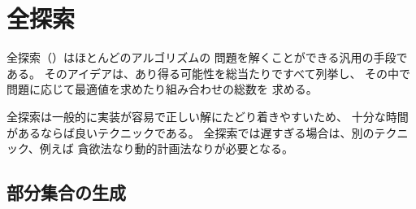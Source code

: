 \begin{comment}
\chapter{Complete search}

\key{Complete search}
is a general method that can be used
to solve almost any algorithm problem.
The idea is to generate all possible
solutions to the problem using brute force,
and then select the best solution or count the
number of solutions, depending on the problem.

Complete search is a good technique
if there is enough time to go through all the solutions,
because the search is usually easy to implement
and it always gives the correct answer.
If complete search is too slow,
other techniques, such as greedy algorithms or
dynamic programming, may be needed.
\end{comment}

\chapter{全探索}

全探索（）はほとんどのアルゴリズムの
問題を解くことができる汎用の手段である。
そのアイデアは、あり得る可能性を総当たりですべて列挙し、
その中で問題に応じて最適値を求めたり組み合わせの総数を
求める。

全探索は一般的に実装が容易で正しい解にたどり着きやすいため、
十分な時間があるならば良いテクニックである。
全探索では遅すぎる場合は、別のテクニック、例えば
貪欲法なり動的計画法なりが必要となる。


\begin{comment}
\section{Generating subsets}

\index{subset}

We first consider the problem of generating
all subsets of a set of $n$ elements.
For example, the subsets of $\{0,1,2\}$ are
$\emptyset$, $\{0\}$, $\{1\}$, $\{2\}$, $\{0,1\}$,
$\{0,2\}$, $\{1,2\}$ and $\{0,1,2\}$.
There are two common methods to generate subsets:
we can either perform a recursive search
or exploit the bit representation of integers.
\end{comment}

\section{部分集合の生成}

